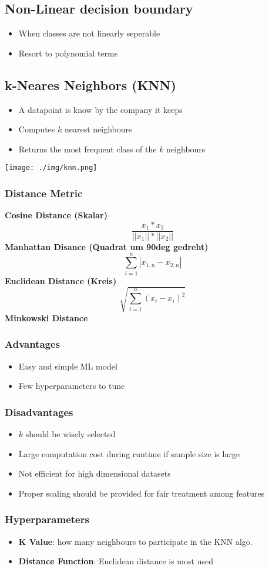 \subsection{Non-Linear decision boundary}
\begin{itemize}
    \item When classes are not linearly seperable
    \item Resort to polynomial terms
\end{itemize}

\subsection{k-Neares Neighbors (KNN)}
\begin{itemize}
    \item A datapoint is know by the company it keeps
    \item Computes $k$ nearest neighbours
    \item Returns the most frequent class of the $k$ neighbours
\end{itemize}
\texttt{[image: ./img/knn.png]}
\subsubsection{Distance Metric}
\textbf{Cosine Distance (Skalar)}
\[ \frac{x_{1}*x_{2}}{||x_{1}||*||x_{2}||} \]
\textbf{Manhattan Disance (Quadrat um 90deg gedreht)}
\[ \sum_{i=1}^{n} |x_{1,n} - x_{2,n}|\] 
\textbf{Euclidean Distance (Kreis)}
\[ \sqrt{\sum_{i=1}^n (x_{i} - x_{i})^2} \]
\textbf{Minkowski Distance}
\subsubsection{Advantages}
\begin{itemize}
    \item Easy and simple ML model
    \item Few hyperparameters to tune
\end{itemize}

\subsubsection{Disadvantages}
\begin{itemize}
    \item $k$ should be wisely selected
    \item Large computation cost during runtime if sample size is large
    \item Not efficient for high dimensional datasets
    \item Proper scaling should be provided for fair treatment among features
\end{itemize}

\subsubsection{Hyperparameters}
\begin{itemize}
    \item \textbf{K Value}: how many neighbours to participate in the KNN algo.
    \item \textbf{Distance Function}: Euclidean distance is most used
\end{itemize}